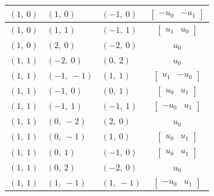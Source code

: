\documentclass[11pt]{article}
\theoremstyle{definition}
\begin{document}
\begin{longtable}{|l|l|l|c|}
    \hline
    $\left( 1, \  0\right)$ & $\left( 1, \  0\right)$ & $\left( -1, \  0\right)$ & $\left[\begin{matrix}- u_{0} & - u_{1}\end{matrix}\right]$ \\
    \hline
    $\left( 1, \  0\right)$ & $\left( 1, \  1\right)$ & $\left( -1, \  1\right)$ & $\left[\begin{matrix}u_{1} & u_{0}\end{matrix}\right]$ \\
    \hline
    $\left( 1, \  0\right)$ & $\left( 2, \  0\right)$ & $\left( -2, \  0\right)$ & $u_{0}$ \\
    \hline
    $\left( 1, \  1\right)$ & $\left( -2, \  0\right)$ & $\left( 0, \  2\right)$ & $u_{0}$ \\
    \hline
    $\left( 1, \  1\right)$ & $\left( -1, \  -1\right)$ & $\left( 1, \  1\right)$ & $\left[\begin{matrix}u_{1} & - u_{0}\end{matrix}\right]$ \\
    \hline
    $\left( 1, \  1\right)$ & $\left( -1, \  0\right)$ & $\left( 0, \  1\right)$ & $\left[\begin{matrix}u_{0} & u_{1}\end{matrix}\right]$ \\
    \hline
    $\left( 1, \  1\right)$ & $\left( -1, \  1\right)$ & $\left( -1, \  1\right)$ & $\left[\begin{matrix}- u_{0} & u_{1}\end{matrix}\right]$ \\
    \hline
    $\left( 1, \  1\right)$ & $\left( 0, \  -2\right)$ & $\left( 2, \  0\right)$ & $u_{0}$ \\
    \hline
    $\left( 1, \  1\right)$ & $\left( 0, \  -1\right)$ & $\left( 1, \  0\right)$ & $\left[\begin{matrix}u_{0} & u_{1}\end{matrix}\right]$ \\
    \hline
    $\left( 1, \  1\right)$ & $\left( 0, \  1\right)$ & $\left( -1, \  0\right)$ & $\left[\begin{matrix}u_{0} & u_{1}\end{matrix}\right]$ \\
    \hline
    $\left( 1, \  1\right)$ & $\left( 0, \  2\right)$ & $\left( -2, \  0\right)$ & $u_{0}$ \\
    \hline
    $\left( 1, \  1\right)$ & $\left( 1, \  -1\right)$ & $\left( 1, \  -1\right)$ & $\left[\begin{matrix}- u_{0} & u_{1}\end{matrix}\right]$ \\

\end{longtable}
\end{document}
